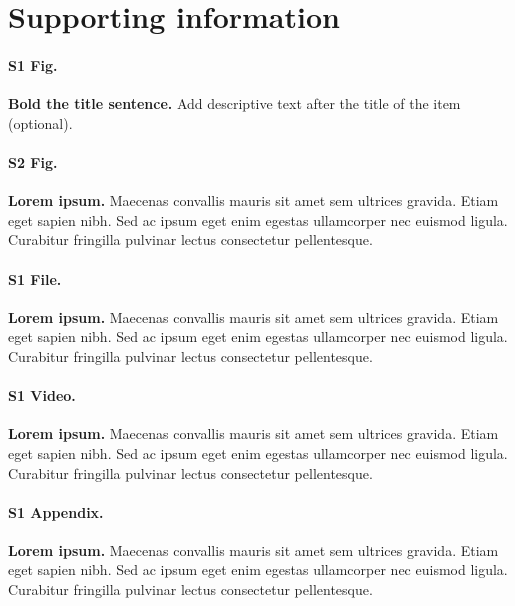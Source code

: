 \documentclass[10pt,letterpaper]{article}
\begin{document}
\section*{Supporting information}

\paragraph*{S1 Fig.}
\label{S1_Fig}
{\bf Bold the title sentence.} Add descriptive text after the title of the item (optional).

\paragraph*{S2 Fig.}
\label{S2_Fig}
{\bf Lorem ipsum.} Maecenas convallis mauris sit amet sem ultrices gravida. Etiam eget sapien nibh. Sed ac ipsum eget enim egestas ullamcorper nec euismod ligula. Curabitur fringilla pulvinar lectus consectetur pellentesque.

\paragraph*{S1 File.}
\label{S1_File}
{\bf Lorem ipsum.}  Maecenas convallis mauris sit amet sem ultrices gravida. Etiam eget sapien nibh. Sed ac ipsum eget enim egestas ullamcorper nec euismod ligula. Curabitur fringilla pulvinar lectus consectetur pellentesque.

\paragraph*{S1 Video.}
\label{S1_Video}
{\bf Lorem ipsum.}  Maecenas convallis mauris sit amet sem ultrices gravida. Etiam eget sapien nibh. Sed ac ipsum eget enim egestas ullamcorper nec euismod ligula. Curabitur fringilla pulvinar lectus consectetur pellentesque.

\paragraph*{S1 Appendix.}
\label{S1_Appendix}
{\bf Lorem ipsum.} Maecenas convallis mauris sit amet sem ultrices gravida. Etiam eget sapien nibh. Sed ac ipsum eget enim egestas ullamcorper nec euismod ligula. Curabitur fringilla pulvinar lectus consectetur pellentesque.
\end{document}
